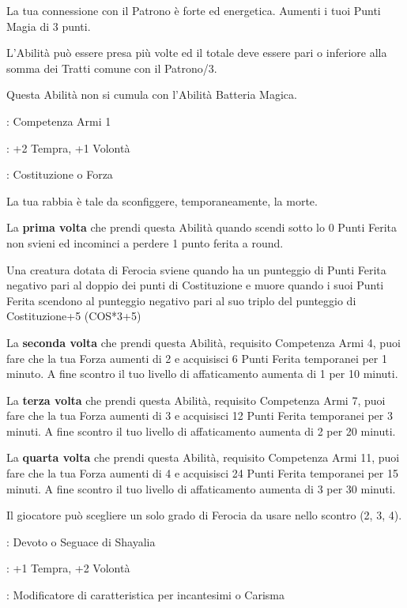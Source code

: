 \begin{multicols}{2}
La tua connessione con il Patrono è forte ed energetica. Aumenti i tuoi Punti Magia di 3 punti.

L'Abilità può essere presa più volte ed il totale deve essere pari o inferiore alla somma dei Tratti comune con il Patrono/3.

Questa Abilità non si cumula con l'Abilità Batteria Magica.

\begin{description}[noitemsep, topsep=0pt, parsep=0pt, partopsep=0pt, leftmargin=0cm, labelwidth=2.5cm]
    \item[\textbf{Requisito}]: Competenza Armi 1
    \item[\textbf{Tiri Salvezza}]: +2 Tempra, +1 Volontà
    \item[\textbf{Caratteristica}]: Costituzione o Forza
\end{description}

La tua rabbia è tale da sconfiggere, temporaneamente, la morte.

La \textbf{prima volta} che prendi questa Abilità quando scendi sotto lo 0 Punti Ferita non svieni ed incominci a perdere 1 punto ferita a round.

Una creatura dotata di Ferocia sviene quando ha un punteggio di Punti Ferita negativo pari al doppio dei punti di Costituzione e muore quando i suoi Punti Ferita scendono al punteggio negativo pari al suo triplo del punteggio di Costituzione+5 (COS*3+5)

La \textbf{seconda volta} che prendi questa Abilità, requisito Competenza Armi 4, puoi fare che la tua Forza aumenti di 2 e acquisisci 6 Punti Ferita temporanei per 1 minuto. A fine scontro il tuo livello di affaticamento aumenta di 1 per 10 minuti.

La \textbf{terza volta} che prendi questa Abilità, requisito Competenza Armi 7, puoi fare che la tua Forza aumenti di 3 e acquisisci 12 Punti Ferita temporanei per 3 minuti. A fine scontro il tuo livello di affaticamento aumenta di 2 per 20 minuti.

La \textbf{quarta volta} che prendi questa Abilità, requisito Competenza Armi 11, puoi fare che la tua Forza aumenti di 4 e acquisisci 24 Punti Ferita temporanei per 15 minuti. A fine scontro il tuo livello di affaticamento aumenta di 3 per 30 minuti.

Il giocatore può scegliere un solo grado di Ferocia da usare nello scontro (2, 3, 4).

\begin{description}[noitemsep, topsep=0pt, parsep=0pt, partopsep=0pt, leftmargin=0cm, labelwidth=2.5cm]
    \item[\textbf{Requisito}]: Devoto o Seguace di Shayalia
    \item[\textbf{Tiri Salvezza}]: +1 Tempra, +2 Volontà
    \item[\textbf{Caratteristica}]: Modificatore di caratteristica per incantesimi o Carisma
\end{description}


\end{multicols}
